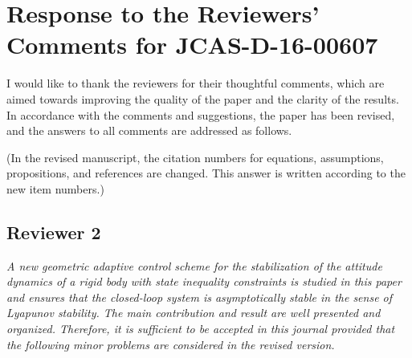 \documentclass[11pt]{article}
\begin{document}

\section*{Response to the Reviewers' Comments for JCAS-D-16-00607}

I would like to thank the reviewers for their thoughtful comments, which are aimed
towards improving the quality of the paper and the clarity of the results. In accordance with the comments and suggestions, the paper has been revised, and the answers to all comments are addressed as follows.

(In the revised manuscript, the citation numbers for equations, assumptions, propositions, and references are changed. This answer is written according to the new item numbers.)

\subsection*{Reviewer 2}

\textit{A new geometric adaptive control scheme for the stabilization of the attitude dynamics of a rigid body with state inequality constraints is studied in this paper and ensures that the closed-loop system is asymptotically stable in the sense of Lyapunov stability. The main contribution and result are well presented and organized. Therefore, it is sufficient to be accepted in this journal provided that the following minor problems are considered in the revised version.
}
\end{document}
